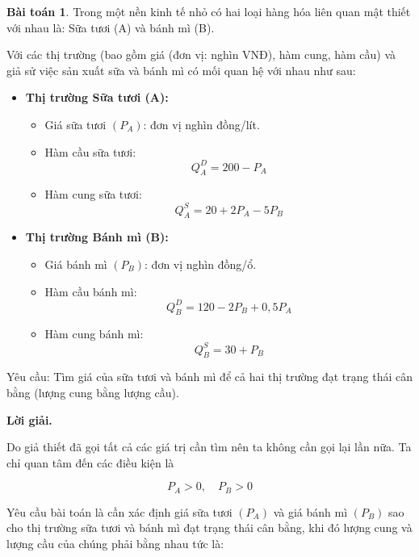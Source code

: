 \documentclass[12pt,a4paper,oneside]{book}
\theoremstyle{theorem}
\theoremstyle{definition}
\newtheorem{bt}[theorem2]{Bài toán}
\begin{document}
\begin{bt}
     Trong một nền kinh tế nhỏ có hai loại hàng hóa liên quan mật thiết với nhau là:
Sữa tươi (A) và bánh mì (B).

\medskip

Với các thị trường (bao gồm giá (đơn vị: nghìn VNĐ), hàm cung, hàm cầu)
và giả sử việc sản xuất sữa và bánh mì có mối quan hệ với nhau như sau:

\begin{itemize}
    \item \textbf{Thị trường Sữa tươi (A):}

    \begin{itemize}
        \item Giá sữa tươi \((P_A)\): đơn vị nghìn đồng/lít.
        
        \item Hàm cầu sữa tươi:
        \[
        Q_A^D=200-P_A
        \]

        \item Hàm cung sữa tươi:
        \[
        Q_A^S=20+2P_A-5P_B
        \]
    \end{itemize}

    \item \textbf{Thị trường Bánh mì (B):}

    \begin{itemize}
        \item Giá bánh mì \((P_B)\): đơn vị nghìn đồng/ổ.

        \item Hàm cầu bánh mì:
        \[
        Q_B^D=120-2P_B+0,5P_A
        \]

        \item Hàm cung bánh mì:
        \[
        Q_B^S=30+P_B
        \]
    \end{itemize}
\end{itemize}

Yêu cầu: Tìm giá của sữa tươi và bánh mì để cả hai thị trường đạt trạng
thái cân bằng (lượng cung bằng lượng cầu).

\bigskip

\textbf{Lời giải.}

\medskip

Do giả thiết đã gọi tất cả các giá trị cần tìm nên ta không cần gọi lại lần
nữa. Ta chỉ quan tâm đến các điều kiện là

\[
P_A>0,\quad P_B>0
\]

Yêu cầu bài toán là cần xác định giá sữa tươi \((P_A)\) và giá bánh mì
\((P_B)\) sao cho thị trường sữa tươi và bánh mì đạt trạng thái cân bằng,
khi đó lượng cung và lượng cầu của chúng phải bằng nhau tức là:


\end{bt}
\end{document}
